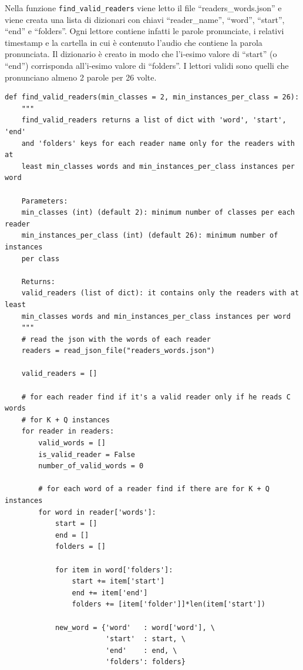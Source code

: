 \documentclass[12pt,a4paper,titlepage]{article}
\begin{document}
Nella funzione \texttt{find\_valid\_readers} viene letto il file ``readers\_words.json'' e viene creata una lista di dizionari con chiavi ``reader\_name'', ``word'', ``start'', ``end'' e ``folders''. Ogni lettore contiene infatti le parole pronunciate, i relativi timestamp e la cartella in cui è contenuto l'audio che contiene la parola pronunciata. Il dizionario è creato in modo che l'i-esimo valore di ``start'' (o ``end'') corrisponda all'i-esimo valore di ``folders''. I lettori validi sono quelli che pronunciano almeno 2 parole per 26 volte.

\begin{lstlisting}[language=iPython,firstnumber=10, caption=Funzione \texttt{find\_valid\_readers}, label=find_valid_readers,captionpos=b]
def find_valid_readers(min_classes = 2, min_instances_per_class = 26):
    """
    find_valid_readers returns a list of dict with 'word', 'start', 'end'
    and 'folders' keys for each reader name only for the readers with at
    least min_classes words and min_instances_per_class instances per word

    Parameters:
    min_classes (int) (default 2): minimum number of classes per each reader
    min_instances_per_class (int) (default 26): minimum number of instances 
    per class

    Returns:
    valid_readers (list of dict): it contains only the readers with at least
    min_classes words and min_instances_per_class instances per word
    """
    # read the json with the words of each reader
    readers = read_json_file("readers_words.json")

    valid_readers = []

    # for each reader find if it's a valid reader only if he reads C words
    # for K + Q instances
    for reader in readers:    
        valid_words = []
        is_valid_reader = False
        number_of_valid_words = 0

        # for each word of a reader find if there are for K + Q instances
        for word in reader['words']:
            start = []
            end = []
            folders = []

            for item in word['folders']:
                start += item['start']
                end += item['end']
                folders += [item['folder']]*len(item['start'])

            new_word = {'word'   : word['word'], \
                        'start'  : start, \
                        'end'    : end, \
                        'folders': folders}


\end{lstlisting}
\end{document}
